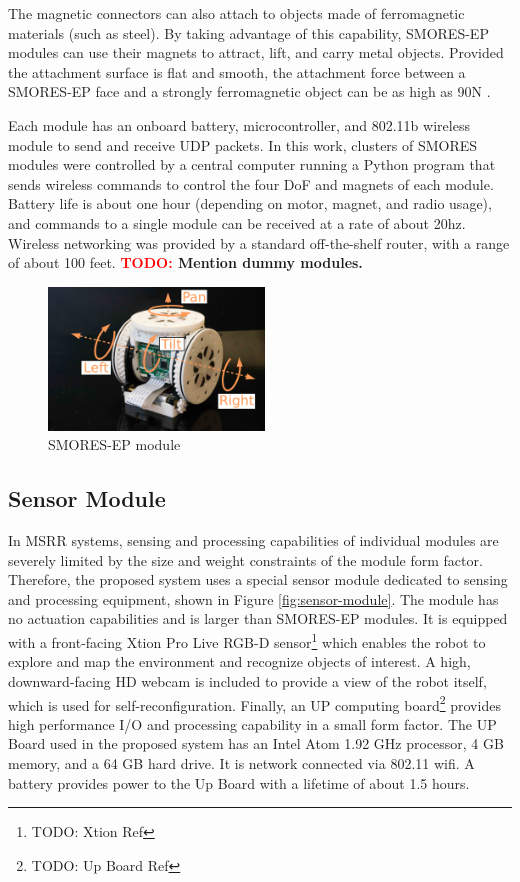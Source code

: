 \documentclass[conference]{IEEEtran}
\newcommand{\TODO}[1]{ {\bf \textcolor{red}{TODO:} #1 }}
\begin{document}
The magnetic connectors can also attach to objects made of ferromagnetic
materials (such as steel).  By taking advantage of this capability, SMORES-EP
modules can use their magnets to attract, lift, and carry metal objects.
Provided the attachment surface is flat and smooth, the attachment force
between a SMORES-EP face and a strongly ferromagnetic object can be as high as
90N \cite{tosun2016design}.

Each module has an onboard battery, microcontroller, and 802.11b wireless
module to send and receive UDP packets.  In this work, clusters of SMORES
modules were controlled by a central computer running a Python program that
sends wireless commands to control the four DoF and magnets of each module.
Battery life is about one hour (depending on motor, magnet, and radio usage),
and commands to a single module can be received at a rate of about 20hz.
Wireless networking was provided by a standard off-the-shelf  router, with a
range of about 100 feet.
\TODO{Mention dummy modules.}
\begin{figure}   
\begin{center}
\includegraphics[height=1.5in]{images/smores_dof.pdf}
\end{center}
\caption{SMORES-EP module}
\label{fig:smores-module}
\end{figure}
%

\subsection{Sensor Module} %
\label{sec:sensor_module}
%

In MSRR systems, sensing and processing capabilities of individual modules are severely limited by the size and weight constraints of the module form factor. Therefore, the proposed system uses a special sensor module dedicated to sensing and processing equipment, shown in Figure \ref{fig:sensor-module}. The module has no actuation capabilities and is larger than SMORES-EP modules. It is equipped with a front-facing Xtion Pro Live RGB-D sensor\footnote{TODO: Xtion Ref} which enables the robot to explore and map the environment and recognize objects of interest. A high, downward-facing HD webcam is included to provide a view of the robot itself, which is used for self-reconfiguration. Finally, an UP computing board\footnote{TODO: Up Board Ref} provides high performance I/O and processing capability in a small form factor. The UP Board used in the proposed system has an Intel Atom 1.92 GHz processor, 4 GB memory, and a 64 GB hard drive. It is network connected via 802.11 wifi. A battery provides power to the Up Board with a lifetime of about 1.5 hours.
\end{document}
